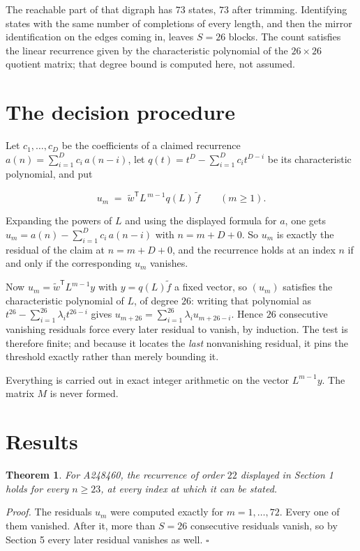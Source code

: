 \documentclass[11pt]{article}
\newtheorem{theorem}{Theorem}
\theoremstyle{definition}
\begin{document}
The reachable part of that digraph has $73$ states, $73$ after trimming. Identifying states with the same number of completions of every length, and then the mirror identification on the edges coming in, leaves $S = 26$ blocks. The count satisfies the linear recurrence given by the characteristic polynomial of the $26\times26$ quotient matrix; that degree bound is computed here, not assumed.

\section{The decision procedure}

Let $c_1,\dots,c_D$ be the coefficients of a claimed recurrence $a(n) = \sum_{i=1}^{D} c_i\,a(n-i)$, let $q(t) = t^{D} - \sum_{i=1}^{D} c_i t^{D-i}$ be its characteristic polynomial, and put

\[u_m \;=\; \tilde w^{\mathsf T} L^{\,m-1} q(L)\,\tilde f \qquad (m \ge 1).\]

Expanding the powers of $L$ and using the displayed formula for $a$, one gets $u_m = a(n) - \sum_{i=1}^{D} c_i\,a(n-i)$ with $n = m + D + 0$. So $u_m$ is exactly the residual of the claim at $n = m + D + 0$, and the recurrence holds at an index $n$ if and only if the corresponding $u_m$ vanishes.

Now $u_m = \tilde w^{\mathsf T} L^{m-1} y$ with $y = q(L)\tilde f$ a fixed vector, so $(u_m)$ satisfies the characteristic polynomial of $L$, of degree $26$: writing that polynomial as $t^{26} - \sum_{i=1}^{26} \lambda_i t^{26-i}$ gives $u_{m+26} = \sum_{i=1}^{26} \lambda_i u_{m+26-i}$. Hence $26$ consecutive vanishing residuals force every later residual to vanish, by induction. The test is therefore finite; and because it locates the {\itshape last} nonvanishing residual, it pins the threshold exactly rather than merely bounding it.

Everything is carried out in exact integer arithmetic on the vector $L^{m-1}y$. The matrix $M$ is never formed.

\section{Results}

\begin{theorem} For A248460, the recurrence of order $22$ displayed in Section 1 holds for every $n \ge 23$, at every index at which it can be stated.\end{theorem}

{\itshape Proof.} The residuals $u_m$ were computed exactly for $m = 1,\dots,72$. Every one of them vanished. After it, more than $S = 26$ consecutive residuals vanish, so by Section 5 every later residual vanishes as well. $\square$
\end{document}
